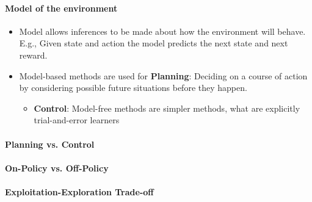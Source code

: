 \documentclass[a4paper, twoside, 12pt]{article}
\begin{document}
\paragraph{Model of the environment}
\label{sec:org0b52c8a}
\begin{itemize}
\item Model allows inferences to be made about how the environment will behave.
E.g., Given state and action the model predicts the next state and next reward.
\item Model-based methods are used for \textbf{\textbf{Planning}}: Deciding on a course of action by
considering possible future situations before they happen.
\begin{itemize}
\item \textbf{\textbf{Control}}: Model-free methods are simpler methods, what are explicitly trial-and-error learners
\end{itemize}
\end{itemize}

\paragraph{Planning vs. Control}
\label{sec:org15357d7}
\paragraph{On-Policy vs. Off-Policy}
\label{sec:orgd3385c3}
\paragraph{Exploitation-Exploration Trade-off}
\label{sec:orgc8bfba8}
\end{document}
